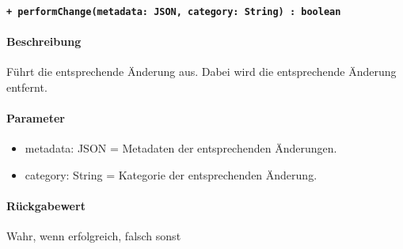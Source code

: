 \paragraph{\texttt{+ performChange(metadata: JSON, category: String) : boolean}}%
\paragraph*{Beschreibung}
Führt die entsprechende Änderung aus.
Dabei wird die entsprechende Änderung entfernt.
\paragraph*{Parameter}
\begin{itemize}
    \item metadata: JSON = Metadaten der entsprechenden Änderungen.
    \item category: String = Kategorie der entsprechenden Änderung.
\end{itemize}
\paragraph*{Rückgabewert}
Wahr, wenn erfolgreich, falsch sonst
